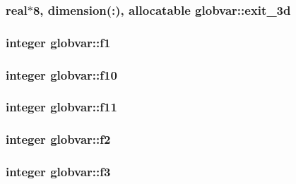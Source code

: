 \subsubsection[{exit\+\_\+3d}]{\setlength{\rightskip}{0pt plus 5cm}real$\ast$8, dimension(\+:), allocatable globvar\+::exit\+\_\+3d}\label{namespaceglobvar_a76a4a0e1d9be5d28829cd29c3e41a533}
\hypertarget{namespaceglobvar_ad587987756a26ab8482d669091aa11e2}{}
\subsubsection[{f1}]{\setlength{\rightskip}{0pt plus 5cm}integer globvar\+::f1}\label{namespaceglobvar_ad587987756a26ab8482d669091aa11e2}
\hypertarget{namespaceglobvar_a31893a074cdc83965ae93c821376be2b}{}
\subsubsection[{f10}]{\setlength{\rightskip}{0pt plus 5cm}integer globvar\+::f10}\label{namespaceglobvar_a31893a074cdc83965ae93c821376be2b}
\hypertarget{namespaceglobvar_a8107e26d71f5d153179d812a2060f289}{}
\subsubsection[{f11}]{\setlength{\rightskip}{0pt plus 5cm}integer globvar\+::f11}\label{namespaceglobvar_a8107e26d71f5d153179d812a2060f289}
\hypertarget{namespaceglobvar_ab013958d5d057b8aca4e06ba0daa8406}{}
\subsubsection[{f2}]{\setlength{\rightskip}{0pt plus 5cm}integer globvar\+::f2}\label{namespaceglobvar_ab013958d5d057b8aca4e06ba0daa8406}
\hypertarget{namespaceglobvar_a22ec31cd077818915aa449475242ebc1}{}
\subsubsection[{f3}]{\setlength{\rightskip}{0pt plus 5cm}integer globvar\+::f3}\label{namespaceglobvar_a22ec31cd077818915aa449475242ebc1}
\hypertarget{namespaceglobvar_ac3c062c849a3ecf6de129ae085a265ae}{}
